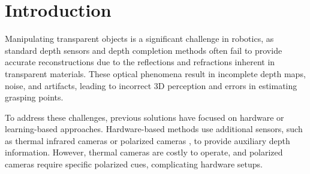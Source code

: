 \section{Introduction}
\label{sec:intro}



Manipulating transparent objects is a significant challenge in robotics, as standard depth sensors and depth completion methods often fail to provide accurate reconstructions due to the reflections and refractions inherent in transparent materials. These optical phenomena result in incomplete depth maps, noise, and artifacts, leading to incorrect 3D perception and errors in estimating grasping points.

To address these challenges, previous solutions have focused on hardware or learning-based approaches. Hardware-based methods use additional sensors, such as thermal infrared cameras \cite{huo-2023-tip} or polarized cameras \cite{mei-2022-cvpr, kalra-2020-cvpr}, to provide auxiliary depth information. However, thermal cameras are costly to operate, and polarized cameras require specific polarized cues, complicating hardware setups.

